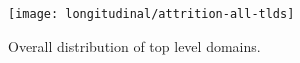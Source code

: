 
















\begin{figure}[Ht]
    \centering
    \texttt{[image: longitudinal/attrition-all-tlds]}
    \caption{Overall distribution of top level domains.}
    \label{fig:longitudinal:attrition:attrition-all-tlds}
\end{figure}





